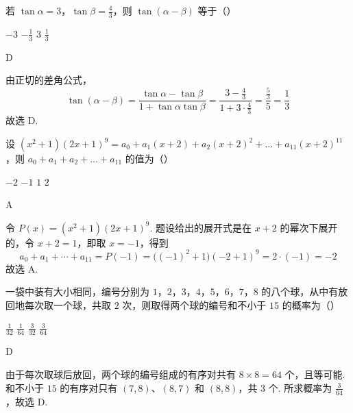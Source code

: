 \begin{problem}
若 \(\tan \alpha = 3\)，\(\tan \beta = \frac{4}{3}\)，则 \(\tan (\alpha - \beta)\) 等于（\quad）

\choices
    {\(-3\)}
    {\( -\frac{1}{3} \)}
    {\(3\)}
    {\( \frac{1}{3} \)}

\begin{answer}
D
\end{answer}

\begin{solution}
由正切的差角公式，
\[
\tan(\alpha-\beta)=\frac{\tan\alpha-\tan\beta}{1+\tan\alpha\tan\beta}=\frac{3-\frac{4}{3}}{1+3\cdot\frac{4}{3}}=\frac{\frac{5}{3}}{5}=\frac{1}{3}
\]
故选 D.
\end{solution}
\end{problem}

\begin{problem}
设 \((x^{2} + 1)(2x + 1)^{9} = a_{0} + a_{1}(x + 2) + a_{2}(x + 2)^{2} + \dots +a_{11}(x + 2)^{11}\)，则 \(a_0 + a_1 + a_2 + \dots +a_{11}\) 的值为（\quad）

\choices
    {\(-2\)}
    {\(-1\)}
    {\(1\)}
    {\(2\)}

\begin{answer}
A
\end{answer}

\begin{solution}
令
\(P(x)=(x^2+1)(2x+1)^9\). 题设给出的展开式是在 \(x+2\) 的幂次下展开的，令 \(x+2=1\)，即取 \(x=-1\)，得到
\[
a_0+a_1+\cdots+a_{11}=P(-1)=\bigl((-1)^2+1\bigr)(-2+1)^9=2\cdot(-1)=-2
\]
故选 A.
\end{solution}
\end{problem}

\begin{problem}
一袋中装有大小相同，编号分别为 \(1\)，\(2\)，\(3\)，\(4\)，\(5\)，\(6\)，\(7\)，\(8\) 的八个球，从中有放回地每次取一个球，共取 \(2\) 次，则取得两个球的编号和不小于 \(15\) 的概率为（\quad）

\choices
    {\(\frac{1}{32}\)}
    {\(\frac{1}{64}\)}
    {\(\frac{3}{32}\)}
    {\(\frac{3}{64}\)}

\begin{answer}
D
\end{answer}

\begin{solution}
由于每次取球后放回，两个球的编号组成的有序对共有 \(8\times8=64\) 个，且等可能. 和不小于 \(15\) 的有序对只有
\((7,8)\)、\((8,7)\) 和 \((8,8)\)，共 \(3\) 个. 所求概率为 \(\frac{3}{64}\)，故选 D.
\end{solution}
\end{problem}

